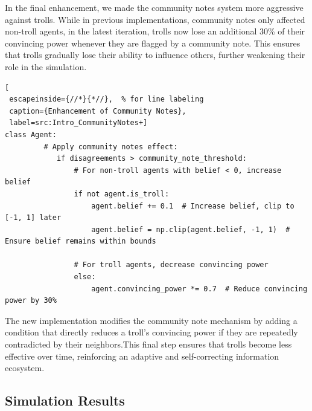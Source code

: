 \documentclass[a4paper,11pt]{scrartcl}
\begin{document}
In the final enhancement, we made the community notes system more aggressive against trolls. While in previous implementations, community notes only affected non-troll agents, in the latest iteration, trolls now lose an additional 30\% of their convincing power whenever they are flagged by a community note. This ensures that trolls gradually lose their ability to influence others, further weakening their role in the simulation.

\begin{lstlisting}[
 escapeinside={//*}{*//},  % for line labeling
 caption={Enhancement of Community Notes},
 label=src:Intro_CommunityNotes+]
class Agent:
         # Apply community notes effect:
            if disagreements > community_note_threshold:
                # For non-troll agents with belief < 0, increase belief
                if not agent.is_troll:
                    agent.belief += 0.1  # Increase belief, clip to [-1, 1] later
                    agent.belief = np.clip(agent.belief, -1, 1)  # Ensure belief remains within bounds

                # For troll agents, decrease convincing power
                else:
                    agent.convincing_power *= 0.7  # Reduce convincing power by 30%
\end{lstlisting}  

The new implementation modifies the community note mechanism by adding a condition that directly reduces a troll’s convincing power if they are repeatedly contradicted by their neighbors.This final step ensures that trolls become less effective over time, reinforcing an adaptive and self-correcting information ecosystem.

\subsection{Simulation Results}
\end{document}

